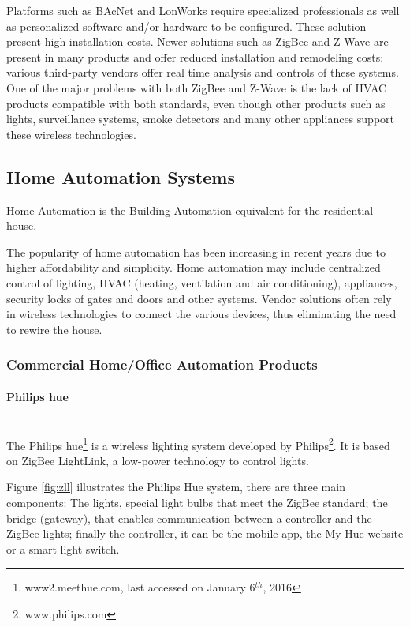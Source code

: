 Platforms such as BAcNet and LonWorks require specialized professionals as well as personalized software and/or hardware to be configured. These solution present high installation costs. Newer solutions such as ZigBee and Z-Wave are present in many products and offer reduced installation and remodeling costs: various third-party vendors offer real time analysis and controls of these systems. One of the major problems with both ZigBee and Z-Wave is the lack of HVAC products compatible with both standards, even though other products such as lights, surveillance systems, smoke detectors and many other appliances support these wireless technologies.




\subsection{Home Automation Systems} \label{ssec:num1}

Home Automation is the Building Automation equivalent for the residential house.

The popularity of home automation has been increasing in recent years due to higher affordability and simplicity. Home automation  may include centralized control of lighting, HVAC (heating, ventilation and air conditioning), appliances, security locks of gates and doors and other systems.
Vendor solutions often rely in wireless technologies to connect the various devices, thus eliminating the need to rewire the house.

\subsubsection{Commercial Home/Office Automation Products}



\paragraph{Philips hue}\mbox{}\\



The Philips hue\footnote{www2.meethue.com, last accessed on January 6$^{th}$, 2016} is a wireless lighting system developed by Philips\footnote{www.philips.com}. It is based on ZigBee LightLink\cite{zigbee:ZLL}, a low-power technology to control lights.

Figure \ref{fig:zll} illustrates the Philips Hue system, there are three main components: The lights, special light bulbs that meet the ZigBee standard; the bridge (gateway), that enables communication between a controller and the ZigBee lights; finally the controller, it can be the mobile app, the My Hue website or a smart light switch.


